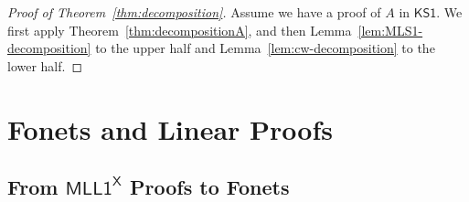 \documentclass[conference,twosided,10pt]{IEEEtran}
\newcommand{\todo}[1]{{\color{red}     \noindent[\![\![{\bf TODO: }#1]\!]\!]}}
\theoremstyle{definition}
\newcommand*{\FOMLL}{\mathsf{MLL1^X}}
\newcommand*{\FOKS}{\mathsf{KS1}}
\begin{document}
\begin{proof}[Proof of Theorem~\ref{thm:decomposition}]
  Assume we have a proof of $A$ in $\FOKS$. We first apply
  Theorem~\ref{thm:decompositionA}, and then
  Lemma~\ref{lem:MLS1-decomposition} to the upper half and
  Lemma~\ref{lem:cw-decomposition} to the lower half.
\end{proof}


\section{Fonets and Linear Proofs}
\label{sec:linear}


\subsection{From $\FOMLL$ Proofs to Fonets}
\end{document}
